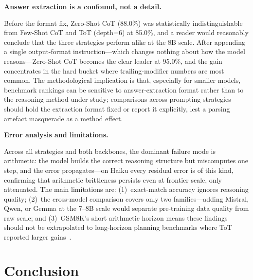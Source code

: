 \documentclass[conference]{IEEEtran}
\begin{document}
\vspace{4.5pt}\noindent\textbf{Answer extraction is a confound, not a detail.}

Before the format fix, Zero-Shot CoT (88.0\%) was statistically
indistinguishable from Few-Shot CoT and ToT (depth=6) at 85.0\%, and a
reader would reasonably conclude that the three strategies perform
alike at the 8B scale.
After appending a single output-format instruction---which changes
nothing about how the model reasons---Zero-Shot CoT becomes the clear
leader at 95.0\%, and the gain concentrates in the hard bucket where
trailing-modifier numbers are most common.
The methodological implication is that, especially for smaller models,
benchmark rankings can be sensitive to answer-extraction format rather
than to the reasoning method under study; comparisons across prompting
strategies should hold the extraction format fixed or report it
explicitly, lest a parsing artefact masquerade as a method effect.

\vspace{4.5pt}\noindent\textbf{Error analysis and limitations.}

Across all strategies and both backbones, the dominant failure mode is
arithmetic: the model builds the correct reasoning structure but
miscomputes one step, and the error propagates---on Haiku every
residual error is of this kind, confirming that arithmetic brittleness
persists even at frontier scale, only attenuated.
The main limitations are: (1)~exact-match accuracy ignores reasoning
quality; (2)~the cross-model comparison covers only two families---adding
Mistral, Qwen, or Gemma at the 7--8B scale would separate pre-training
data quality from raw scale; and (3)~GSM8K's short arithmetic horizon
means these findings should not be extrapolated to long-horizon
planning benchmarks where ToT reported larger gains~\cite{yao2023tot}.

\section{Conclusion}
\label{sec:conclusion}
\end{document}

